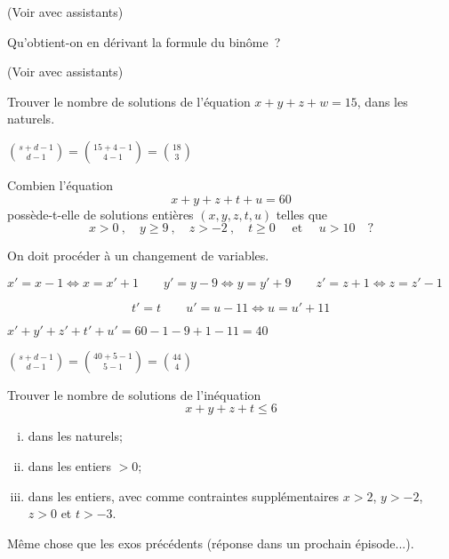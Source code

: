 (Voir avec assistants)


\begin{exo}
Qu'obtient-on en d\'erivant la formule du bin\^ome~?
\end{exo}

(Voir avec assistants)


\begin{exo}
Trouver le nombre de solutions de l'\'equation $x + y + z + w = 15$, dans les naturels.
\end{exo}

$ { s + d - 1 \choose d - 1 } = { 15 + 4 - 1 \choose 4 - 1} = {18 \choose 3 }$


\begin{exo} 
Combien l'\'equation
$$
x + y + z + t + u = 60
$$
poss\`ede-t-elle de solutions enti\`eres $(x,y,z,t,u)$ telles que
$$
x > 0\ ,\quad y \geqslant 9\ , \quad z > -2\ , \quad t \geqslant 0 \quad \textrm{ et }  \quad u > 10 \quad ?
$$
\end{exo}

On doit procéder à un changement de variables.

${x}' = x-1 \Leftrightarrow x= {x}'+1 \qquad {y}' = y-9 \Leftrightarrow y= {y}'+9 \qquad {z}' = z+1 \Leftrightarrow z= {z}'-1 $

$\qquad \qquad \qquad \qquad \qquad {t}' = t \qquad {u}' = u-11 \Leftrightarrow u= {u}'+11$

${x}'+{y}'+{z}'+{t}'+{u}' = 60 - 1 - 9 + 1 - 11 = 40$

${s + d - 1 \choose d - 1} = {40 + 5 - 1 \choose 5 - 1} = {44 \choose 4}$

\begin{exo} 
Trouver le nombre de solutions de l'in\'equation
$$
x + y + z + t \leqslant 6
$$
%
\begin{enumerate}[(i)]
\item dans les naturels;
\item dans les entiers $>0$;
\item dans les entiers, avec comme contraintes suppl\'ementaires $x > 2$, $y > -2$, $z > 0$ et $t > -3$.
\end{enumerate}
\end{exo}

Même chose que les exos précédents (réponse dans un prochain épisode...).

